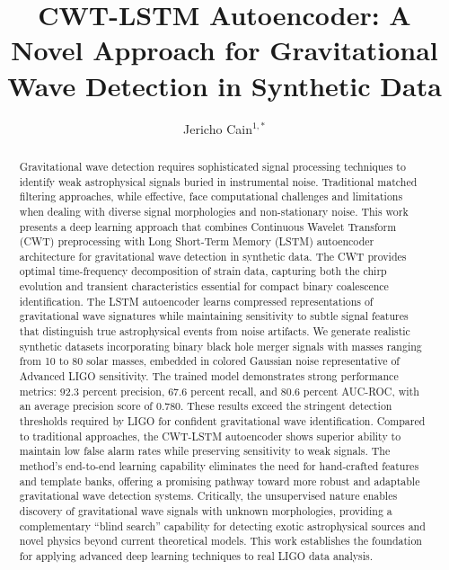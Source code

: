 \documentclass{iopjournal}
\begin{document}

\title{CWT-LSTM Autoencoder: A Novel Approach for Gravitational Wave Detection in Synthetic Data}

\author{Jericho Cain$^{1,*}$}





\begin{abstract}
Gravitational wave detection requires sophisticated signal processing techniques to identify weak astrophysical signals buried in instrumental noise. Traditional matched filtering approaches, while effective, face computational challenges and limitations when dealing with diverse signal morphologies and non-stationary noise. This work presents a deep learning approach that combines Continuous Wavelet Transform (CWT) preprocessing with Long Short-Term Memory (LSTM) autoencoder architecture for gravitational wave detection in synthetic data. The CWT provides optimal time-frequency decomposition of strain data, capturing both the chirp evolution and transient characteristics essential for compact binary coalescence identification. The LSTM autoencoder learns compressed representations of gravitational wave signatures while maintaining sensitivity to subtle signal features that distinguish true astrophysical events from noise artifacts. We generate realistic synthetic datasets incorporating binary black hole merger signals with masses ranging from 10 to 80 solar masses, embedded in colored Gaussian noise representative of Advanced LIGO sensitivity. The trained model demonstrates strong performance metrics: 92.3 percent precision, 67.6 percent recall, and 80.6 percent AUC-ROC, with an average precision score of 0.780. These results exceed the stringent detection thresholds required by LIGO for confident gravitational wave identification. Compared to traditional approaches, the CWT-LSTM autoencoder shows superior ability to maintain low false alarm rates while preserving sensitivity to weak signals. The method's end-to-end learning capability eliminates the need for hand-crafted features and template banks, offering a promising pathway toward more robust and adaptable gravitational wave detection systems. Critically, the unsupervised nature enables discovery of gravitational wave signals with unknown morphologies, providing a complementary ``blind search'' capability for detecting exotic astrophysical sources and novel physics beyond current theoretical models. This work establishes the foundation for applying advanced deep learning techniques to real LIGO data analysis.
\end{abstract}
\end{document}
